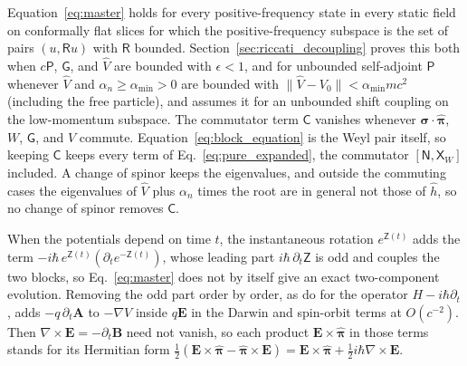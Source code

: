 \documentclass[aps,prd,onecolumn,tightenlines,nofootinbib,notitlepage,11pt,floatfix]{revtex4-2}
\theoremstyle{indentedtheorem}
\begin{document}
Equation~\eqref{eq:master} holds for every positive-frequency state in every static field on conformally flat slices for which the positive-frequency subspace is the set of pairs $(u,\mathsf{R}u)$ with $\mathsf{R}$ bounded. Section~\ref{sec:riccati_decoupling} proves this both when $c\mathsf{P}$, $\mathsf{G}$, and $\hat{V}$ are bounded with $\epsilon<1$, and for unbounded self-adjoint $\mathsf{P}$ whenever $\hat{V}$ and $\alpha_n\ge\alpha_{\min}>0$ are bounded with $\|\hat{V}-V_0\|<\alpha_{\min}mc^2$ (including the free particle), and assumes it for an unbounded shift coupling on the low-momentum subspace. The commutator term $\mathsf{C}$ vanishes whenever $\boldsymbol{\sigma}\cdot\hat{\boldsymbol{\pi}}$, $W$, $\mathsf{G}$, and $\hat{V}$ commute. Equation~\eqref{eq:block_equation} is the Weyl pair itself, so keeping $\mathsf{C}$ keeps every term of Eq.~\eqref{eq:pure_expanded}, the commutator $[\mathsf{N},\mathsf{X}_W]$ included. A change of spinor keeps the eigenvalues, and outside the commuting cases the eigenvalues of $\hat{V}$ plus $\alpha_n$ times the root are in general not those of $\hat{h}$, so no change of spinor removes $\mathsf{C}$.

When the potentials depend on time $t$, the instantaneous rotation $e^{\mathsf{Z}(t)}$ adds the term $-i\hbar\,e^{\mathsf{Z}(t)}(\partial_t e^{-\mathsf{Z}(t)})$, whose leading part $i\hbar\,\partial_t\mathsf{Z}$ is odd and couples the two blocks, so Eq.~\eqref{eq:master} does not by itself give an exact two-component evolution. Removing the odd part order by order, as \citet{Foldy1950Dirac} do for the operator $H - i\hbar\partial_t$, adds $-q\,\partial_t\mathbf{A}$ to $-\nabla V$ inside $q\mathbf{E}$ in the Darwin and spin-orbit terms at $O(c^{-2})$. Then $\nabla\times\mathbf{E}=-\partial_t\mathbf{B}$ need not vanish, so each product $\mathbf{E}\times\hat{\boldsymbol{\pi}}$ in those terms stands for its Hermitian form $\tfrac{1}{2}(\mathbf{E}\times\hat{\boldsymbol{\pi}}-\hat{\boldsymbol{\pi}}\times\mathbf{E})=\mathbf{E}\times\hat{\boldsymbol{\pi}}+\tfrac{1}{2}i\hbar\nabla\times\mathbf{E}$.
\end{document}
